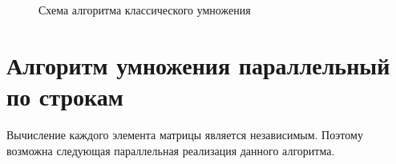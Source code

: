 \documentclass[12pt,a4paper]{report}
\begin{document}
\begin{figure}[h!]
    \caption{Схема алгоритма классического умножения}
    \label{fig:image}
\end{figure}

\newpage
\section{Алгоритм умножения параллельный по строкам}

Вычисление каждого элемента матрицы является независимым. Поэтому возможна следующая параллельная 
реализация данного алгоритма. 
\end{document}
